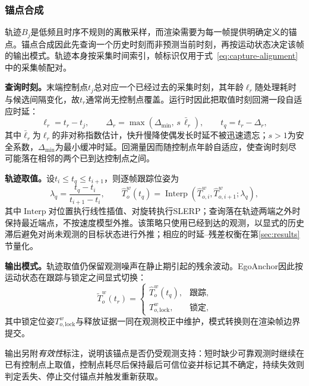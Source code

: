 \documentclass[review]{vgtc}
\begin{document}
\subsubsection{锚点合成}\label{sec:frame-output}

轨迹$B_j$是低频且时序不规则的离散采样，而渲染需要为每一帧提供明确定义的锚点。锚点合成因此先查询一个历史时刻而非预测当前时刻，再按运动状态决定该帧的输出模式。轨迹本身按采集时间索引，帧标识仅用于式~\eqref{eq:capture-alignment}中的采集帧配对。

\textbf{查询时刻。}末端控制点$t_j$总对应一个已经过去的采集时刻，其年龄$\ell_r$随处理耗时与候选间隔变化，故$t_r$通常尚无控制点覆盖。运行时因此把取值时刻回溯一段自适应时延：
\begin{equation}
\ell_r = t_r - t_j, \qquad \Delta_r = \max(\Delta_{\min},\, s\,\bar{\ell}_r), \qquad t_q = t_r - \Delta_r,
\label{eq:target-time}
\end{equation}
其中$\bar{\ell}_r$为$\ell_r$的非对称指数估计，快升慢降使偶发长时延不被迅速遗忘；$s>1$为安全系数，$\Delta_{\min}$为最小缓冲时延。回溯量因而随控制点年龄自适应，使查询时刻尽可能落在相邻的两个已到达控制点之间。

\textbf{轨迹取值。}设$t_i \leq t_q \leq t_{i+1}$，则逐帧跟踪位姿为
\begin{equation}
\lambda_q = \frac{t_q - t_i}{t_{i+1} - t_i}, \qquad \widehat{T}_o^w(t_q) = \operatorname{Interp}(\widehat{T}_{o,i}^{w}, \widehat{T}_{o,i+1}^{w}; \lambda_q),
\label{eq:delayed-interp}
\end{equation}
其中$\operatorname{Interp}$对位置执行线性插值、对旋转执行SLERP；查询落在轨迹两端之外时保持最近端点，不按速度模型外推。该策略只使用已经到达的观测，以显式的历史滞后避免对尚未观测的目标状态进行外推；相应的时延--残差权衡在第\ref{sec:results}节量化。

\textbf{输出模式。}轨迹取值仍保留观测噪声在静止期引起的残余波动。EgoAnchor因此按运动状态在跟踪与锁定之间显式切换：
\begin{equation}
\widetilde{T}_o^w(t_r) = \begin{cases}
\widehat{T}_o^w(t_q), & \text{跟踪}, \\
T_{o,\mathrm{lock}}^w, & \text{锁定},
\end{cases}
\label{eq:staticlock}
\end{equation}
其中锁定位姿$T_{o,\mathrm{lock}}^w$与释放证据一同在观测校正中维护，模式转换则在渲染帧边界提交。

输出另附\emph{有效性}标注，说明该锚点是否仍受观测支持：短时缺少可靠观测时继续在已有控制点上取值，控制点耗尽后保持最后可信位姿并标记其不确定，持续失效则判定丢失、停止交付锚点并触发重新获取。
\end{document}
